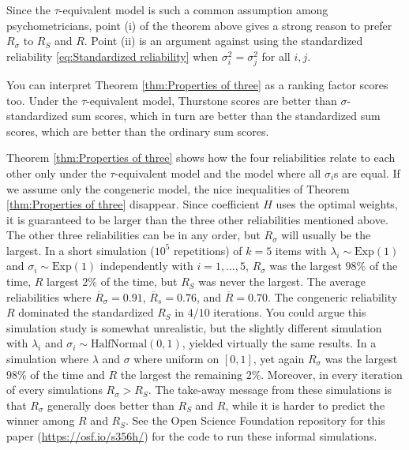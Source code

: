 \documentclass[twoside]{article}
\begin{document}
Since the $\tau$-equivalent model is such a common assumption among psychometricians, point (i) of the theorem above gives a strong reason to prefer $ R_{\sigma}$ to $ R_S$ and $ R$. Point (ii) is an argument against using the standardized reliability \eqref{eq:Standardized reliability} when $\sigma_{i}^{2}=\sigma_j^{2}$ for all $i,j$.

You can interpret Theorem \ref{thm:Properties of three} as a ranking factor scores too. Under the $\tau$-equivalent model, Thurstone scores are better than $\sigma$-standardized sum scores, which in turn are better than the standardized sum scores, which are
better than the ordinary sum scores.



Theorem \ref{thm:Properties of three} shows how the four reliabilities relate to each other only under the $\tau$-equivalent model and the model where all $\sigma_i$s are equal. If we assume only the congeneric model, the nice inequalities of Theorem \ref{thm:Properties of three} disappear. Since coefficient $H$ uses the optimal weights, it is guaranteed to be larger than the three other reliabilities mentioned above. The
other three reliabilities can be in any order, but
$ R_{\sigma}$ will usually be the largest. In a short
simulation ($10^{5}$ repetitions) of $k=5$ items with $\lambda_{i}\sim \textrm{Exp}(1)$
and $\sigma_{i}\sim \textrm{Exp}(1)$ independently with $i=1,\ldots,5$, $ R_{\sigma}$
was the largest $98\%$ of the time, $ R$ largest $2\%$
of the time, but $ R_{S}$ was never the largest. The average reliabilities where $\overline{ R}_\sigma = 0.91$, $\overline{ R}_s= 0.76$, and $\overline{ R} = 0.70$.
The congeneric reliability $ R$ dominated the standardized $ R_{S}$ in $4/10$ iterations. You could argue this simulation study
is somewhat unrealistic, but the slightly different simulation with $\lambda_{i}$ and $\sigma_{i}\sim \textrm{HalfNormal}(0,1)$, yielded virtually the same results. In a simulation where $\lambda$ and $\sigma$ where uniform on $[0,1]$, yet again $ R_{\sigma}$
was the largest $98\%$ of the time and $ R$ the largest the remaining $2\%$. Moreover, in every iteration of every simulations $ R_\sigma >  R_S$. The take-away message from these simulations is that $ R_\sigma$ generally does better than $ R_{S}$ and
$ R$, while it is harder to predict the winner among $ R$
and $ R_{S}$. See the Open Science Foundation repository for this paper (\url{https://osf.io/s356h/}) for the code to run these informal simulations.
\end{document}
